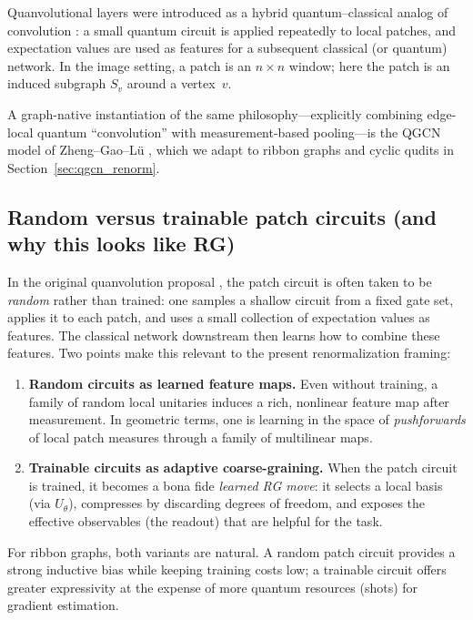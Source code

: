 \documentclass[11pt,oneside]{amsbook}
\numberwithin{equation}{section}
\theoremstyle{plain}
\theoremstyle{definition}
\theoremstyle{remark}
\begin{document}
Quanvolutional layers were introduced as a hybrid quantum--classical analog of convolution \cite{Henderson2019Quanv}:
a small quantum circuit is applied repeatedly to local patches, and expectation values are used as
features for a subsequent classical (or quantum) network. In the image setting, a patch is an
$n\times n$ window; here the patch is an induced subgraph $S_v$ around a vertex~$v$.

A graph-native instantiation of the same philosophy---explicitly combining edge-local quantum ``convolution'' with measurement-based pooling---is the QGCN model of Zheng--Gao--L\"u \cite{Zheng2021QGCN}, which we adapt to ribbon graphs and cyclic qudits in Section~\ref{sec:qgcn_renorm}.

\subsection{Random versus trainable patch circuits (and why this looks like RG)}
\label{subsec:quanv_random_trainable}
In the original quanvolution proposal \cite{Henderson2019Quanv}, the patch circuit is often taken to be
\emph{random} rather than trained: one samples a shallow circuit from a fixed gate set, applies it to each
patch, and uses a small collection of expectation values as features. The classical network downstream then
learns how to combine these features. Two points make this relevant to the present renormalization framing:
\begin{enumerate}
\item \textbf{Random circuits as learned feature maps.} Even without training, a family of random local
unitaries induces a rich, nonlinear feature map after measurement. In geometric terms, one is learning in the
space of \emph{pushforwards} of local patch measures through a family of multilinear maps.
\item \textbf{Trainable circuits as adaptive coarse-graining.} When the patch circuit is trained, it becomes a
bona fide \emph{learned RG move}: it selects a local basis (via $U_\theta$), compresses by discarding degrees of
freedom, and exposes the effective observables (the readout) that are helpful for the task.
\end{enumerate}
For ribbon graphs, both variants are natural. A random patch circuit provides a strong inductive bias while
keeping training costs low; a trainable circuit offers greater expressivity at the expense of more quantum
resources (shots) for gradient estimation.
\end{document}
